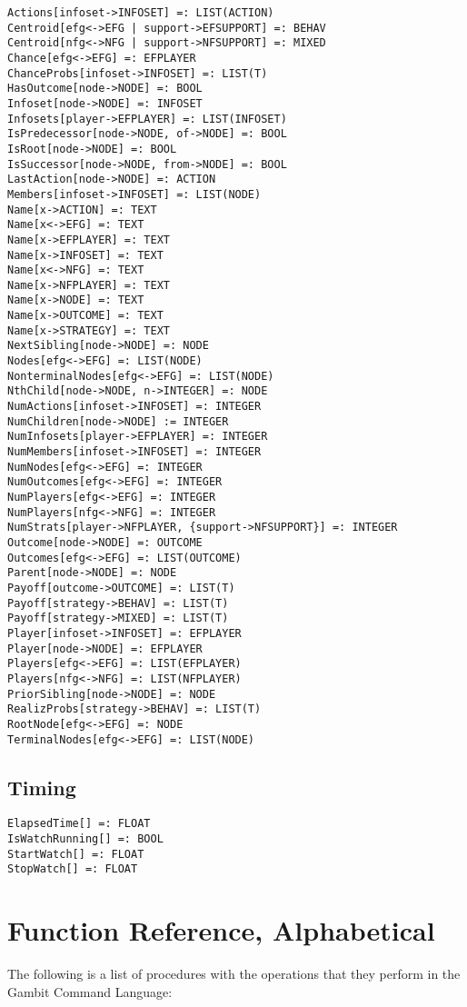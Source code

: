 \begin{verbatim}
Actions[infoset->INFOSET] =: LIST(ACTION)
Centroid[efg<->EFG | support->EFSUPPORT] =: BEHAV
Centroid[nfg<->NFG | support->NFSUPPORT] =: MIXED
Chance[efg<->EFG] =: EFPLAYER
ChanceProbs[infoset->INFOSET] =: LIST(T)
HasOutcome[node->NODE] =: BOOL
Infoset[node->NODE] =: INFOSET
Infosets[player->EFPLAYER] =: LIST(INFOSET)
IsPredecessor[node->NODE, of->NODE] =: BOOL
IsRoot[node->NODE] =: BOOL
IsSuccessor[node->NODE, from->NODE] =: BOOL
LastAction[node->NODE] =: ACTION
Members[infoset->INFOSET] =: LIST(NODE)
Name[x->ACTION] =: TEXT
Name[x<->EFG] =: TEXT
Name[x->EFPLAYER] =: TEXT
Name[x->INFOSET] =: TEXT
Name[x<->NFG] =: TEXT
Name[x->NFPLAYER] =: TEXT
Name[x->NODE] =: TEXT
Name[x->OUTCOME] =: TEXT
Name[x->STRATEGY] =: TEXT
NextSibling[node->NODE] =: NODE
Nodes[efg<->EFG] =: LIST(NODE)
NonterminalNodes[efg<->EFG] =: LIST(NODE)
NthChild[node->NODE, n->INTEGER] =: NODE
NumActions[infoset->INFOSET] =: INTEGER
NumChildren[node->NODE] := INTEGER
NumInfosets[player->EFPLAYER] =: INTEGER
NumMembers[infoset->INFOSET] =: INTEGER
NumNodes[efg<->EFG] =: INTEGER
NumOutcomes[efg<->EFG] =: INTEGER
NumPlayers[efg<->EFG] =: INTEGER
NumPlayers[nfg<->NFG] =: INTEGER
NumStrats[player->NFPLAYER, {support->NFSUPPORT}] =: INTEGER
Outcome[node->NODE] =: OUTCOME
Outcomes[efg<->EFG] =: LIST(OUTCOME)
Parent[node->NODE] =: NODE
Payoff[outcome->OUTCOME] =: LIST(T)
Payoff[strategy->BEHAV] =: LIST(T)
Payoff[strategy->MIXED] =: LIST(T)
Player[infoset->INFOSET] =: EFPLAYER
Player[node->NODE] =: EFPLAYER
Players[efg<->EFG] =: LIST(EFPLAYER)
Players[nfg<->NFG] =: LIST(NFPLAYER)
PriorSibling[node->NODE] =: NODE
RealizProbs[strategy->BEHAV] =: LIST(T)
RootNode[efg<->EFG] =: NODE
TerminalNodes[efg<->EFG] =: LIST(NODE)
\end{verbatim}

\subsection{Timing}

\begin{verbatim}
ElapsedTime[] =: FLOAT
IsWatchRunning[] =: BOOL
StartWatch[] =: FLOAT
StopWatch[] =: FLOAT
\end{verbatim}


\section{Function Reference, Alphabetical}

The following is a list of procedures with the operations that they
perform in the Gambit Command Language:

